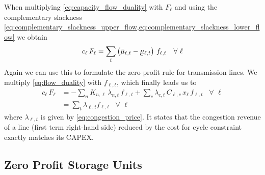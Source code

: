 \documentclass[11pt,twocolumn]{article}
\newcommand{\ubar}[1]{\underaccent{\bar}{#1}}
\newcommand{\Forall}[1]{\hspace{10pt} \forall \,\, #1 }
\newcommand{\flow}{f_{\ell,t}}
\newcommand{\capacityflow}{F_{\ell}}
\newcommand{\capitalpriceflow}{c_{\ell}}
\newcommand{\mulowerflow}{\ubar{\mu}_{\ell,t}}
\newcommand{\muupperflow}{\bar{\mu}_{\ell,t}}
\newcommand{\lmp}[1][n]{\lambda_{#1,t}}
\newcommand{\incidence}[1][n]{K_{#1,\ell}}
\newcommand{\cycle}{C_{\ell,c}}
\newcommand{\reactance}{x_\ell}
\newcommand{\cycleprice}{\lambda_{c,t}}
\begin{document}
When multiplying \cref{eq:capacity_flow_duality} with $\capacityflow$ and using the complementary slackness \cref{eq:complementary_slackness_upper_flow,eq:complementary_slackness_lower_flow} we obtain
\begin{align}
    \capitalpriceflow \, \capacityflow = \sum_t \left( \muupperflow - \mulowerflow \right)  \, \flow \Forall{\ell}
    \label{eq:capital_price_flow_sum}
\end{align}
Again we can use this to formulate the zero-profit rule for transmission lines. We multiply \cref{eq:flow_duality} with $\flow$, which finally leads us to
\begin{align}
    \capitalpriceflow \, \capacityflow & = - \sum_n \incidence\, \lmp\, \flow + \sum_c \cycleprice\, \cycle\, \reactance\, \flow
    \Forall{\ell}                                                                                                                \\
                                       & = \sum_t \lmp[\ell] \flow \Forall{\ell}
\end{align}
where $\lmp[\ell]$ is given by \cref{eq:congestion_price}.
It states that the congestion revenue of a line (first term right-hand side) reduced by the cost for cycle constraint exactly matches its \ac{CAPEX}.


\subsection{Zero Profit Storage Units}
\label{sec:zero_profit_storage_units}
\end{document}
